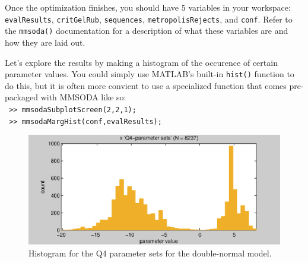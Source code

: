 Once the optimization finishes, you should have 5 variables in your workspace: \texttt{evalResults}, \texttt{critGelRub}, \texttt{sequences}, \texttt{metropolisRejects}, and \texttt{conf}. Refer to the \texttt{mmsoda()} documentation for a description of what these variables are and how they are laid out.

Let's explore the results by making a histogram of the occurence of certain parameter values. You could simply use MATLAB's built-in \texttt{hist()} function to do this, but it is often more convient to use a specialized function that comes pre-packaged with MMSODA like so:\\
\texttt{ >> mmsodaSubplotScreen(2,2,1);}\\
\texttt{ >> mmsodaMargHist(conf,evalResults);}\\



\begin{figure}[htb]
  \centering
    \includegraphics[width=\linewidth , keepaspectratio]{./../eps/mmsodaMargHist.eps}
  \caption{Histogram for the Q4 parameter sets for the double-normal model.}
  \label{fig:mmsodaMargHist}
\end{figure}




